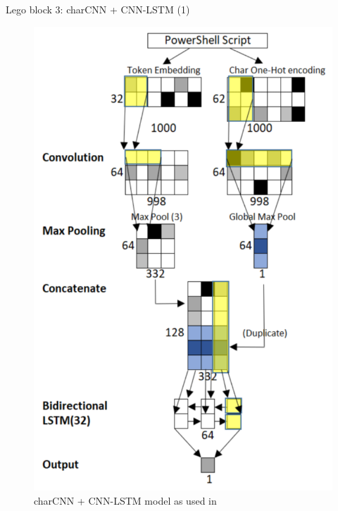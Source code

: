\documentclass[10pt]{beamer}
\begin{document}
\begin{frame}{Lego block 3: charCNN + CNN-LSTM (1)}
	\begin{figure}
		\includegraphics[scale=0.20]{inlineEnsemble}
		\caption{charCNN + CNN-LSTM model as used in \cite{amsi2019}}
	\end{figure}
\end{frame}
\end{document}
